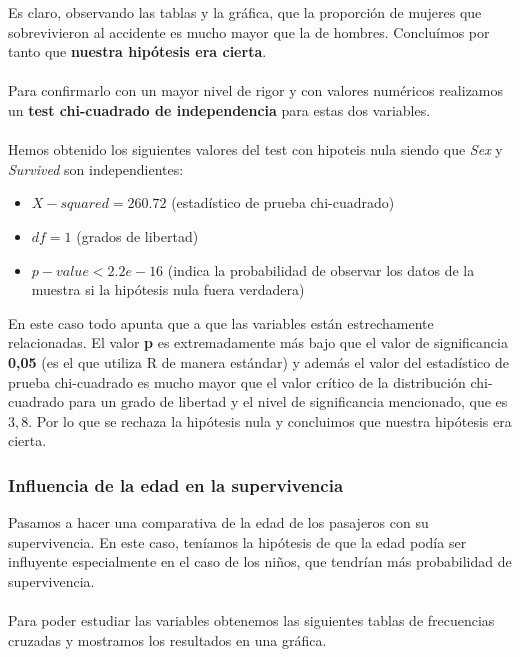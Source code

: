 \documentclass{article}
\begin{document}
\noindent Es claro, observando las tablas y la gráfica, que la proporción de mujeres que sobrevivieron al accidente es mucho mayor que la de hombres. Concluímos por tanto que \textbf{nuestra hipótesis era cierta}.\\\\
Para confirmarlo con un mayor nivel de rigor y con valores numéricos realizamos un \textbf{test chi-cuadrado de independencia} para estas dos variables.\\\\
Hemos obtenido los siguientes valores del test con hipoteis nula siendo que \textit{Sex} y \textit{Survived} son independientes:
\begin{itemize}
    \item $X-squared = 260.72$ (estadístico de prueba chi-cuadrado)
    \item $df = 1$ (grados de libertad)
    \item $p-value < 2.2e-16$ (indica la probabilidad de observar los datos de la muestra si la hipótesis nula fuera verdadera)
\end{itemize}
\noindent En este caso todo apunta que a que las variables están estrechamente relacionadas. El valor \textbf{p} es extremadamente más bajo que el valor de significancia \textbf{0,05} (es el que utiliza R de manera estándar) y además el valor del estadístico de prueba chi-cuadrado es mucho mayor que el valor crítico de la distribución chi-cuadrado para un grado de libertad y el nivel de significancia mencionado, que es $3,8$. Por lo que se rechaza la hipótesis nula y concluimos que nuestra hipótesis era cierta.

\newpage
\subsubsection{Influencia de la edad en la supervivencia}

Pasamos a hacer una comparativa de la edad de los pasajeros con su supervivencia. En este caso, teníamos la hipótesis de que la edad podía ser influyente especialmente en el caso de los niños, que tendrían más probabilidad de supervivencia.\\\\
Para poder estudiar las variables obtenemos las siguientes tablas de frecuencias cruzadas y mostramos los resultados en una gráfica.
\end{document}
